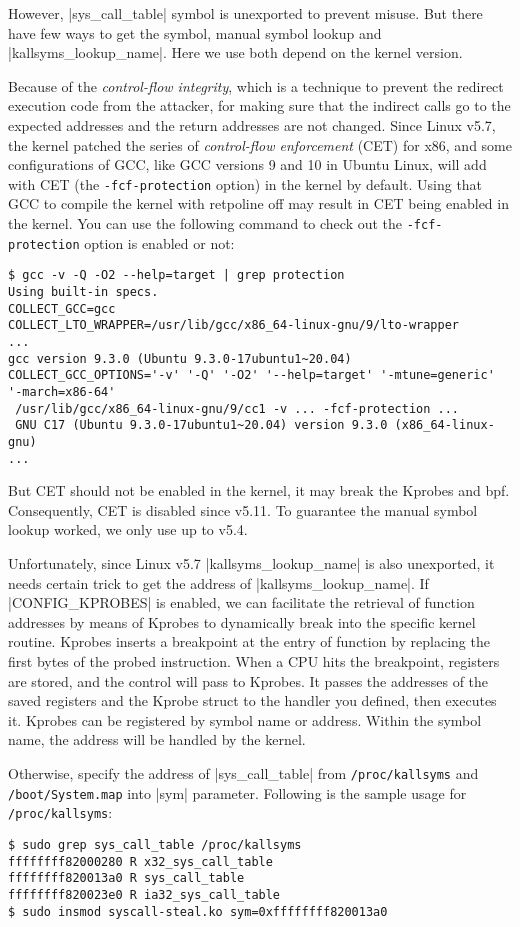 \documentclass[10pt, oneside]{book}
\begin{document}
However, \cpp|sys_call_table| symbol is unexported to prevent misuse.
But there have few ways to get the symbol, manual symbol lookup and \cpp|kallsyms_lookup_name|.
Here we use both depend on the kernel version.

Because of the \textit{control-flow integrity}, which is a technique to prevent the redirect execution code from the attacker, for making sure that the indirect calls go to the expected addresses and the return addresses are not changed.
Since Linux v5.7, the kernel patched the series of \textit{control-flow enforcement} (CET) for x86,
and some configurations of GCC, like GCC versions 9 and 10 in Ubuntu Linux,
will add with CET (the \verb|-fcf-protection| option) in the kernel by default.
Using that GCC to compile the kernel with retpoline off may result in CET being enabled in the kernel.
You can use the following command to check out the \verb|-fcf-protection| option is enabled or not:
\begin{verbatim}
$ gcc -v -Q -O2 --help=target | grep protection
Using built-in specs.
COLLECT_GCC=gcc
COLLECT_LTO_WRAPPER=/usr/lib/gcc/x86_64-linux-gnu/9/lto-wrapper
...
gcc version 9.3.0 (Ubuntu 9.3.0-17ubuntu1~20.04)
COLLECT_GCC_OPTIONS='-v' '-Q' '-O2' '--help=target' '-mtune=generic' '-march=x86-64'
 /usr/lib/gcc/x86_64-linux-gnu/9/cc1 -v ... -fcf-protection ...
 GNU C17 (Ubuntu 9.3.0-17ubuntu1~20.04) version 9.3.0 (x86_64-linux-gnu)
...
\end{verbatim}
But CET should not be enabled in the kernel, it may break the Kprobes and bpf.
Consequently, CET is disabled since v5.11.
To guarantee the manual symbol lookup worked, we only use up to v5.4.

Unfortunately, since Linux v5.7 \cpp|kallsyms_lookup_name| is also unexported, it needs certain trick to get the address of \cpp|kallsyms_lookup_name|.
If \cpp|CONFIG_KPROBES| is enabled, we can facilitate the retrieval of function addresses by means of Kprobes to dynamically break into the specific kernel routine.
Kprobes inserts a breakpoint at the entry of function by replacing the first bytes of the probed instruction.
When a CPU hits the breakpoint, registers are stored, and the control will pass to Kprobes.
It passes the addresses of the saved registers and the Kprobe struct to the handler you defined, then executes it.
Kprobes can be registered by symbol name or address.
Within the symbol name, the address will be handled by the kernel.

Otherwise, specify the address of \cpp|sys_call_table| from \verb|/proc/kallsyms| and \verb|/boot/System.map| into \cpp|sym| parameter.
Following is the sample usage for \verb|/proc/kallsyms|:
\begin{verbatim}
$ sudo grep sys_call_table /proc/kallsyms
ffffffff82000280 R x32_sys_call_table
ffffffff820013a0 R sys_call_table
ffffffff820023e0 R ia32_sys_call_table
$ sudo insmod syscall-steal.ko sym=0xffffffff820013a0
\end{verbatim}
\end{document}
